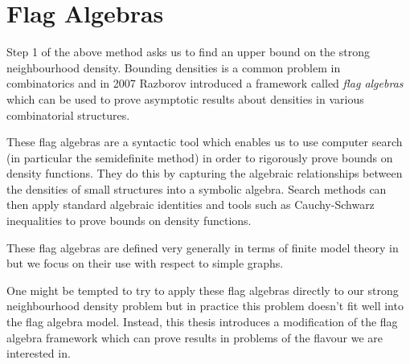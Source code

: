 % 

\section*{Flag Algebras}

Step 1 of the above method
asks us to find an upper bound on the strong neighbourhood density. Bounding densities
is a common problem in combinatorics and in 2007 Razborov \cite{razborovFlagAlgebras2007}
introduced a framework called \textit{flag algebras}
which can be used to prove asymptotic results about densities in various combinatorial structures.

These flag algebras are a syntactic tool which enables us to use computer search (in particular
the semidefinite method) in order to rigorously prove bounds on density functions.
They do this by capturing the algebraic relationships between the densities of small structures
into a symbolic algebra. Search methods can then apply standard algebraic identities and
tools such as Cauchy-Schwarz inequalities to prove bounds on density functions.

These flag algebras are defined very generally in terms of finite model theory in \cite{razborovFlagAlgebras2007} but we focus on their use with respect to simple graphs.

One might be tempted to try to apply these flag algebras directly to our strong neighbourhood
density problem but in practice this problem doesn't fit well into the flag algebra model.
Instead, this thesis introduces a modification of the flag algebra framework which can prove
results in problems of the flavour we are interested in.
